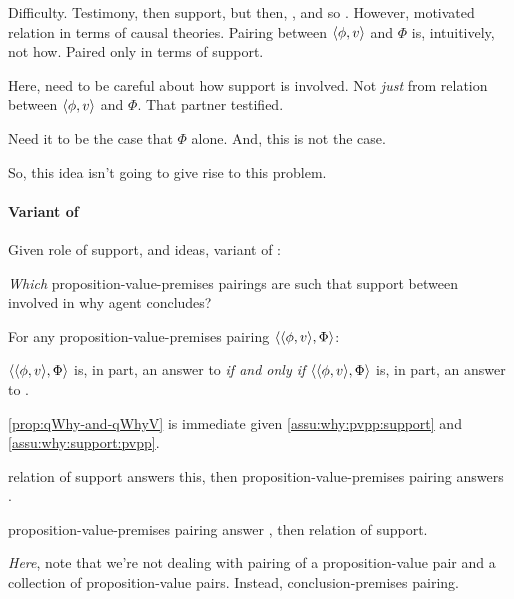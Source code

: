\begin{note}
  Difficulty.
  Testimony, then support, but then, \qWhy{}, and so \qHow{}.
  However, motivated relation in terms of causal theories.
  Pairing between \(\langle \phi, v \rangle\) and \(\Phi\) is, intuitively, not how.
  Paired only in terms of support.

  Here, need to be careful about how support is involved.
  Not \emph{just} from relation between \(\langle \phi, v \rangle\) and \(\Phi\).
  That partner testified.

  Need it to be the case that \(\Phi\) alone.
  And, this is not the case.

  So, this idea isn't going to give rise to this problem.
\end{note}

\paragraph{Variant of \qWhy{}}
\label{sec:clar:expand:qWhy:variant}

\begin{note}
  Given role of support, and ideas, variant of \qWhy{}:

  \begin{question}[\qWhyV{}]
    \label{q:why:v}
    \emph{Which} proposition-value-premises pairings are such that support between involved in why agent concludes?
  \end{question}

  \begin{proposition}
    \label{prop:qWhy-and-qWhyV}
    For any proposition-value-premises pairing \(\langle \langle \phi, v \rangle, \Phi \rangle\):

    \(\langle \langle \phi, v \rangle, \Phi \rangle\) is, in part, an answer to \qWhyV{} \emph{if and only if} \(\langle \langle \phi, v \rangle, \Phi \rangle\) is, in part, an answer to \qWhy{}.
  \end{proposition}

  \begin{argument}
    \autoref{prop:qWhy-and-qWhyV} is immediate given \autoref{assu:why:pvpp:support} and \autoref{assu:why:support:pvpp}.

    relation of support answers this, then proposition-value-premises pairing answers \qWhy{}.

    proposition-value-premises pairing answer \qWhy{}, then relation of support.
  \end{argument}
\end{note}

\begin{note}
  \emph{Here}, note that we're not dealing with pairing of a proposition-value pair and a collection of proposition-value pairs.
  Instead, conclusion-premises pairing.
\end{note}

